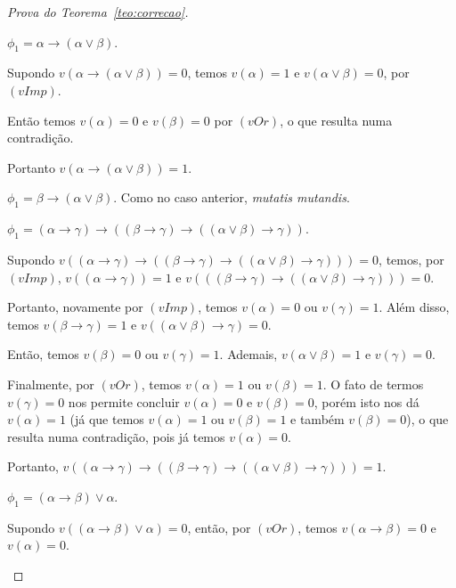\begin{proof}[Prova do Teorema~\ref{teo:correcao}]
\begin{provaporcasos}
\begin{provaporsubcasos}
                \subcasodeprova{} $\phi_{1} = \alpha \to (\alpha \lor \beta)$. 
                
                    Supondo $v(\alpha \to (\alpha \lor \beta)) = 0$, temos $v(\alpha) = 1$ e $v(\alpha \lor \beta) = 0$, por $(vImp)$. 
                    
                    Então temos $v(\alpha) = 0$ e $v(\beta) = 0$ por $(vOr)$, o que resulta numa contradição. 
                    
                    Portanto $v(\alpha \to (\alpha \lor \beta)) = 1$.

                \subcasodeprova{} $\phi_{1} = \beta \to (\alpha \lor \beta)$. Como no caso anterior, \textit{mutatis mutandis}.

                \subcasodeprova{} $\phi_{1} = (\alpha \to \gamma) \to ((\beta \to \gamma) \to ((\alpha \lor \beta) \to \gamma))$. 
                
                    Supondo $v((\alpha \to \gamma) \to ((\beta \to \gamma) \to ((\alpha \lor \beta) \to \gamma))) = 0$, temos, por $(vImp)$, $v((\alpha \to \gamma)) = 1$ e $v(((\beta \to \gamma) \to ((\alpha \lor \beta) \to \gamma))) = 0$. 
                    
                    Portanto, novamente por $(vImp)$, temos $v(\alpha) = 0$ ou $v(\gamma) = 1$. Além disso, temos $v(\beta \to \gamma) = 1$ e $v((\alpha \lor \beta) \to \gamma) = 0$. 
                    
                    Então, temos $v(\beta) = 0$ ou $v(\gamma) = 1$. Ademais, $v(\alpha \lor \beta) = 1$ e $v(\gamma) = 0$. 
                    
                    Finalmente, por $(vOr)$, temos $v(\alpha) = 1$ ou $v(\beta) = 1$. O fato de termos $v(\gamma) = 0$ nos permite concluir $v(\alpha) = 0$ e $v(\beta) = 0$, porém isto nos dá $v(\alpha) = 1$ (já que temos $v(\alpha) = 1$ ou $v(\beta) = 1$ e também $v(\beta) = 0$), o que resulta numa contradição, pois já temos $v(\alpha) = 0$. 
                    
                    Portanto, $v((\alpha \to \gamma) \to ((\beta \to \gamma) \to ((\alpha \lor \beta) \to \gamma))) = 1$.

                \subcasodeprova{} $\phi_{1} = (\alpha \to \beta) \lor \alpha$. 
                    
                    Supondo $v((\alpha \to \beta) \lor \alpha) = 0$, então, por $(vOr)$, temos $v(\alpha \to \beta) = 0$ e $v(\alpha) = 0$. 
                    

\end{provaporsubcasos}
\end{provaporcasos}
\end{proof}
